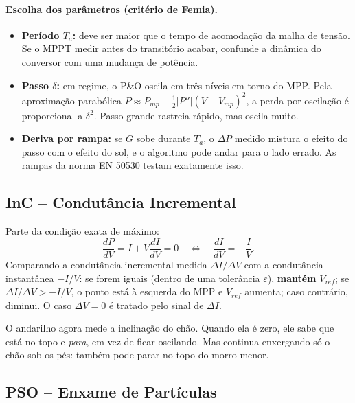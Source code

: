 \documentclass[11pt,a4paper]{article}
\begin{document}
\paragraph{Escolha dos parâmetros (critério de Femia).}
\begin{itemize}
\item \textbf{Período $T_a$:} deve ser maior que o tempo de acomodação da malha de tensão.
Se o MPPT medir antes do transitório acabar, confunde a dinâmica do conversor com uma
mudança de potência.
\item \textbf{Passo $\delta$:} em regime, o P\&O oscila em três níveis em torno do MPP. Pela
aproximação parabólica $P\approx P_{mp}-\tfrac12|P''|(V-V_{mp})^2$, a perda por oscilação é
proporcional a $\delta^2$. Passo grande rastreia rápido, mas oscila muito.
\item \textbf{Deriva por rampa:} se $G$ sobe durante $T_a$, o $\Delta P$ medido mistura o efeito
do passo com o efeito do sol, e o algoritmo pode andar para o lado errado. As rampas da norma
EN 50530 testam exatamente isso.
\end{itemize}

\subsection{InC -- Condutância Incremental}

Parte da condição exata de máximo:
\begin{equation}
\frac{dP}{dV}=I+V\frac{dI}{dV}=0 \quad\Longleftrightarrow\quad \frac{dI}{dV}=-\frac{I}{V}.
\end{equation}
Comparando a condutância incremental medida $\Delta I/\Delta V$ com a condutância instantânea
$-I/V$: se forem iguais (dentro de uma tolerância $\varepsilon$), \textbf{mantém} $V_{ref}$;
se $\Delta I/\Delta V>-I/V$, o ponto está à esquerda do MPP e $V_{ref}$ aumenta; caso
contrário, diminui. O caso $\Delta V=0$ é tratado pelo sinal de $\Delta I$.

\begin{intuicao}
O andarilho agora mede a inclinação do chão. Quando ela é zero, ele sabe que está no topo
e \emph{para}, em vez de ficar oscilando. Mas continua enxergando só o chão sob os pés:
também pode parar no topo do morro menor.
\end{intuicao}

\subsection{PSO -- Enxame de Partículas}
\end{document}

